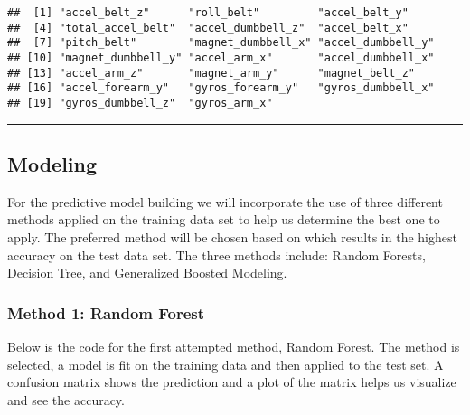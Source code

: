 \documentclass[]{article}
\newenvironment{Shaded}{\begin{snugshade}}{\end{snugshade}}
\newcommand{\KeywordTok}[1]{\textcolor[rgb]{0.13,0.29,0.53}{\textbf{#1}}}
\newcommand{\DataTypeTok}[1]{\textcolor[rgb]{0.13,0.29,0.53}{#1}}
\newcommand{\DecValTok}[1]{\textcolor[rgb]{0.00,0.00,0.81}{#1}}
\newcommand{\StringTok}[1]{\textcolor[rgb]{0.31,0.60,0.02}{#1}}
\newcommand{\CommentTok}[1]{\textcolor[rgb]{0.56,0.35,0.01}{\textit{#1}}}
\newcommand{\OtherTok}[1]{\textcolor[rgb]{0.56,0.35,0.01}{#1}}
\newcommand{\OperatorTok}[1]{\textcolor[rgb]{0.81,0.36,0.00}{\textbf{#1}}}
\newcommand{\NormalTok}[1]{#1}
\begin{document}
\begin{verbatim}
##  [1] "accel_belt_z"      "roll_belt"         "accel_belt_y"     
##  [4] "total_accel_belt"  "accel_dumbbell_z"  "accel_belt_x"     
##  [7] "pitch_belt"        "magnet_dumbbell_x" "accel_dumbbell_y" 
## [10] "magnet_dumbbell_y" "accel_arm_x"       "accel_dumbbell_x" 
## [13] "accel_arm_z"       "magnet_arm_y"      "magnet_belt_z"    
## [16] "accel_forearm_y"   "gyros_forearm_y"   "gyros_dumbbell_x" 
## [19] "gyros_dumbbell_z"  "gyros_arm_x"
\end{verbatim}

\begin{center}\rule{0.5\linewidth}{\linethickness}\end{center}

\subsection{Modeling}\label{modeling}

For the predictive model building we will incorporate the use of three
different methods applied on the training data set to help us determine
the best one to apply. The preferred method will be chosen based on
which results in the highest accuracy on the test data set. The three
methods include: Random Forests, Decision Tree, and Generalized Boosted
Modeling.

\subsubsection{Method 1: Random Forest}\label{method-1-random-forest}

Below is the code for the first attempted method, Random Forest. The
method is selected, a model is fit on the training data and then applied
to the test set. A confusion matrix shows the prediction and a plot of
the matrix helps us visualize and see the accuracy.

\begin{Shaded}
\end{Shaded}
\end{document}
